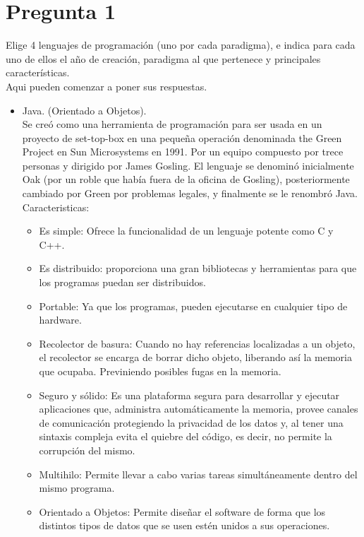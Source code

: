 \section*{Pregunta 1}
\Large 
Elige 4 lenguajes de programación (uno por cada paradigma), e indica para cada uno de ellos el año de creación, paradigma al que pertenece y principales características.\\
\newline
\large
Aqui pueden comenzar a poner sus respuestas.
\newline
\begin{itemize}
	\item Java. (Orientado a Objetos).\\
	Se creó como una herramienta de programación para ser usada en un proyecto de set-top-box en una pequeña operación denominada the Green Project en Sun Microsystems en 1991. Por un equipo compuesto por trece personas y dirigido por James Gosling. El lenguaje se denominó inicialmente Oak (por un roble que había fuera de la oficina de Gosling), posteriormente cambiado por Green por problemas legales, y finalmente se le renombró Java.\\
	Caracteristicas:
	\begin{itemize}
		\item Es simple: Ofrece la funcionalidad de un lenguaje potente como C y C++.
		\item Es distribuido: proporciona una gran bibliotecas y herramientas para que los programas puedan ser distribuidos.
		\item Portable: Ya que los programas, pueden ejecutarse en cualquier tipo de hardware.
		\item Recolector de basura: Cuando no hay referencias localizadas a un objeto, el recolector se encarga de borrar dicho objeto, liberando así la memoria que ocupaba. Previniendo posibles fugas en la memoria.
		\item Seguro y sólido: Es una plataforma segura para desarrollar y ejecutar aplicaciones que, administra automáticamente la memoria, provee canales de comunicación protegiendo la privacidad de los datos y, al tener una sintaxis compleja evita el quiebre del código, es decir, no permite la corrupción del mismo.
		\item Multihilo: Permite llevar a cabo varias tareas simultáneamente dentro del mismo programa.
		\item Orientado a Objetos: Permite diseñar el software de forma que los distintos tipos de datos que se usen estén unidos a sus operaciones.

\end{itemize}
\end{itemize}
